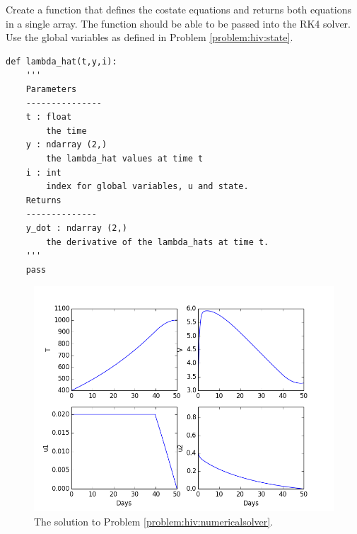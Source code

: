 \begin{problem}
Create a function that defines the costate equations and returns both equations in a single array. The function should be able to be passed into the RK4 solver. Use the global variables as defined in Problem \ref{problem:hiv:state}.

\begin{lstlisting}
def lambda_hat(t,y,i):
	'''
	Parameters
	---------------
	t : float
		the time
	y : ndarray (2,)
		the lambda_hat values at time t
	i : int
		index for global variables, u and state.
	Returns
	--------------
	y_dot : ndarray (2,)
		the derivative of the lambda_hats at time t.
	'''
	pass
\end{lstlisting}

\label{problem:hiv:costateequations}
\end{problem}


\begin{figure}
\centering
\includegraphics[width=5in]{solutions.png}
\caption{The solution to Problem \ref{problem:hiv:numericalsolver}.}
\label{fig:hiv:solutions}
\end{figure}



